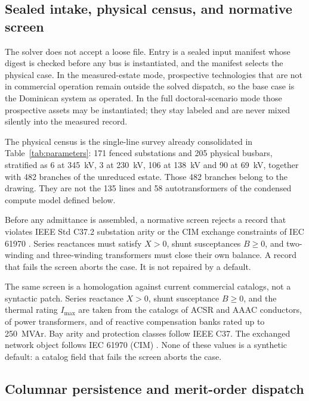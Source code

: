 \subsection{Sealed intake, physical census, and normative screen}
\label{sub:intake}

The solver does not accept a loose file. Entry is a sealed input manifest whose digest is checked before any bus is instantiated, and the manifest selects the physical case. In the measured-estate mode, prospective technologies that are not in commercial operation remain outside the solved dispatch, so the base case is the Dominican system as operated. In the full doctoral-scenario mode those prospective assets may be instantiated; they stay labeled and are never mixed silently into the measured record.

The physical census is the single-line survey already consolidated in Table~\ref{tab:parameters}: 171 fenced substations and 205 physical busbars, stratified as 6 at 345~kV, 3 at 230~kV, 106 at 138~kV and 90 at 69~kV, together with 482 branches of the unreduced estate. Those 482 branches belong to the drawing. They are not the 135 lines and 58 autotransformers of the condensed compute model defined below.

Before any admittance is assembled, a normative screen rejects a record that violates IEEE Std C37.2 \cite{ieeec37_2} substation arity or the CIM exchange constraints of IEC 61970 \cite{iec61970}. Series reactances must satisfy $X > 0$, shunt susceptances $B \ge 0$, and two-winding and three-winding transformers must close their own balance. A record that fails the screen aborts the case. It is not repaired by a default.

The same screen is a homologation against current commercial catalogs, not a syntactic patch. Series reactance $X>0$, shunt susceptance $B\ge 0$, and the thermal rating $I_{\max}$ are taken from the catalogs of ACSR and AAAC conductors, of power transformers, and of reactive compensation banks rated up to 250~MVAr. Bay arity and protection classes follow IEEE C37. The exchanged network object follows IEC 61970 (CIM) \cite{iec61970}. None of these values is a synthetic default: a catalog field that fails the screen aborts the case.


\subsection{Columnar persistence and merit-order dispatch}
\label{sub:columnar}

